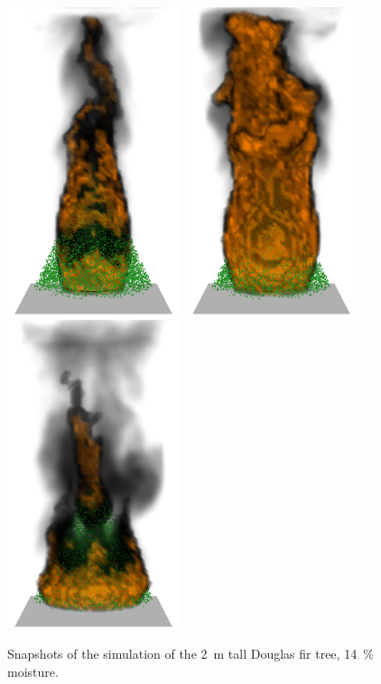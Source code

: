 \begin{figure}[ht]
\includegraphics[width=2in]{FIGURES/NIST_Douglas_Firs/tree_2_m_14_pc_0290}
\includegraphics[width=2in]{FIGURES/NIST_Douglas_Firs/tree_2_m_14_pc_0544}
\includegraphics[width=2in]{FIGURES/NIST_Douglas_Firs/tree_2_m_14_pc_0879}
\caption[Snapshots of a 2~m Douglas fir fire simulation]{Snapshots of the simulation of the 2~m tall Douglas fir tree, 14~\% moisture.}
\label{tree_snaps}
\end{figure}




